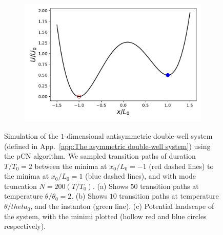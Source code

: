 \begin{figure}
\begin{subfigure}[b]{0.314\textwidth}
        \includegraphics[width=\textwidth]{figs_part1/mcmc/1D_process_potential}
        \caption[]%
        {}    
    \end{subfigure}    
    
    \caption[ ]
    {\small Simulation of the $1$-dimensional antisymmetric double-well system (defined in App.~\ref{app:The asymmetric double-well system}) using the pCN algorithm. We sampled transition paths of duration $T/T_0 = 2$ between the minima at $x_0/L_0 = -1$ (red dashed lines) to the minima at $x_0/L_0 = 1$ (blue dashed lines), and with mode truncation $N = 200(T/T_0)$. (a) Shows $50$ transition paths at temperature $\theta / \theta_0 = 2$. (b) Shows $10$ transition paths at temperature $\theta / theta_0$, and the instanton (green line). (c) Potential landscape of the system, with the minimi plotted (hollow red and blue circles respectively).}
    \label{fig:1D process trajectories}
\end{figure} 

